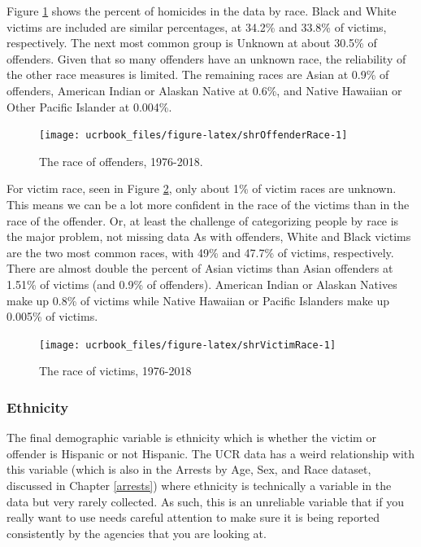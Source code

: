 \documentclass[
  12pt,
  openany]{book}
\begin{document}
Figure \ref{fig:shrOffenderRace} shows the percent of homicides in the data by race. Black and White victims are included are similar percentages, at 34.2\% and 33.8\% of victims, respectively. The next most common group is Unknown at about 30.5\% of offenders. Given that so many offenders have an unknown race, the reliability of the other race measures is limited. The remaining races are Asian at 0.9\% of offenders, American Indian or Alaskan Native at 0.6\%, and Native Hawaiian or Other Pacific Islander at 0.004\%.

\begin{figure}

{\centering \texttt{[image: ucrbook\_files/figure-latex/shrOffenderRace-1]} 

}

\caption{The race of offenders, 1976-2018.}\label{fig:shrOffenderRace}
\end{figure}

For victim race, seen in Figure \ref{fig:shrVictimRace}, only about 1\% of victim races are unknown. This means we can be a lot more confident in the race of the victims than in the race of the offender. Or, at least the challenge of categorizing people by race is the major problem, not missing data As with offenders, White and Black victims are the two most common races, with 49\% and 47.7\% of victims, respectively. There are almost double the percent of Asian victims than Asian offenders at 1.51\% of victims (and 0.9\% of offenders). American Indian or Alaskan Natives make up 0.8\% of victims while Native Hawaiian or Pacific Islanders make up 0.005\% of victims.

\begin{figure}

{\centering \texttt{[image: ucrbook\_files/figure-latex/shrVictimRace-1]} 

}

\caption{The race of victims, 1976-2018}\label{fig:shrVictimRace}
\end{figure}

\hypertarget{ethnicity-1}{%
\subsubsection{Ethnicity}\label{ethnicity-1}}

The final demographic variable is ethnicity which is whether the victim or offender is Hispanic or not Hispanic. The UCR data has a weird relationship with this variable (which is also in the Arrests by Age, Sex, and Race dataset, discussed in Chapter \ref{arrests}) where ethnicity is technically a variable in the data but very rarely collected. As such, this is an unreliable variable that if you really want to use needs careful attention to make sure it is being reported consistently by the agencies that you are looking at.
\end{document}
